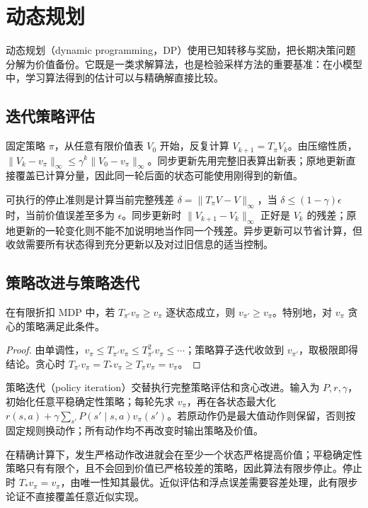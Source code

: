 \setcounter{chapter}{5} %
\chapter{动态规划}
\label{ch:rl-dp}

动态规划（dynamic programming，DP）使用已知转移与奖励，把长期决策问题分解为价值备份。它既是一类求解算法，也是检验采样方法的重要基准：在小模型中，学习算法得到的估计可以与精确解直接比较。

\section{迭代策略评估}

固定策略 $\pi$，从任意有限价值表 $V_0$ 开始，反复计算 $V_{k+1}=T_\pi V_k$。由压缩性质，$\|V_k-v_\pi\|_\infty\leq\gamma^k\|V_0-v_\pi\|_\infty$。同步更新先用完整旧表算出新表；原地更新直接覆盖已计算分量，因此同一轮后面的状态可能使用刚得到的新值。

可执行的停止准则是计算当前完整残差 $\delta=\|T_\pi V-V\|_\infty$，当 $\delta\leq(1-\gamma)\epsilon$ 时，当前价值误差至多为 $\epsilon$。同步更新时 $\|V_{k+1}-V_k\|_\infty$ 正好是 $V_k$ 的残差；原地更新的一轮变化则不能不加说明地当作同一个残差。异步更新可以节省计算，但收敛需要所有状态得到充分更新以及对过旧信息的适当控制。

\section{策略改进与策略迭代}

\begin{theorem}[策略改进]
在有限折扣 MDP 中，若 $T_{\pi'}v_\pi\geq v_\pi$ 逐状态成立，则 $v_{\pi'}\geq v_\pi$。特别地，对 $v_\pi$ 贪心的策略满足此条件。
\end{theorem}
\begin{proof}
由单调性，$v_\pi\leq T_{\pi'}v_\pi\leq T_{\pi'}^2v_\pi\leq\cdots$；策略算子迭代收敛到 $v_{\pi'}$，取极限即得结论。贪心时 $T_{\pi'}v_\pi=T_*v_\pi\geq T_\pi v_\pi=v_\pi$。
\end{proof}

策略迭代（policy iteration）交替执行完整策略评估和贪心改进。输入为 $P,r,\gamma$，初始化任意平稳确定性策略；每轮先求 $v_\pi$，再在各状态最大化 $r(s,a)+\gamma\sum_{s'}P(s'\mid s,a)v_\pi(s')$。若原动作仍是最大值动作则保留，否则按固定规则换动作；所有动作均不再改变时输出策略及价值。

在精确计算下，发生严格动作改进就会在至少一个状态严格提高价值；平稳确定性策略只有有限个，且不会回到价值已严格较差的策略，因此算法有限步停止。停止时 $T_*v_\pi=v_\pi$，由唯一性知其最优。近似评估和浮点误差需要容差处理，此有限步论证不直接覆盖任意近似实现。

